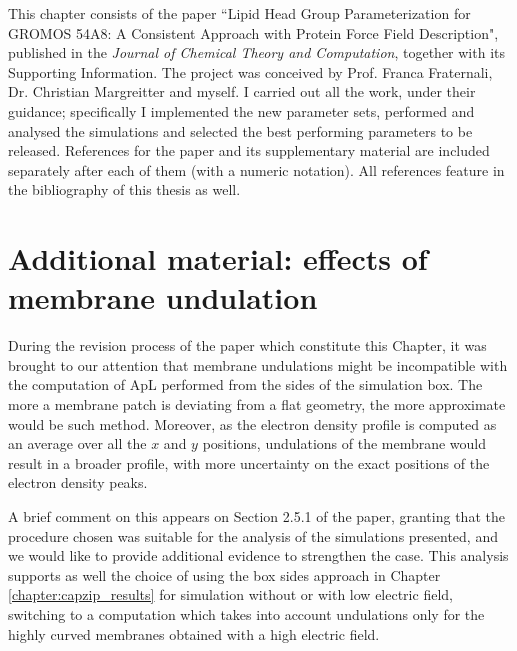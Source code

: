 This chapter consists of the paper ``Lipid Head Group Parameterization for GROMOS 54A8: A Consistent Approach with Protein Force Field Description", published in the \emph{Journal of Chemical Theory and Computation}, together with its Supporting Information. The project was conceived by Prof. Franca Fraternali, Dr. Christian Margreitter and myself. I carried out all the work, under their guidance; specifically I implemented the new parameter sets, performed and analysed the simulations and selected the best performing parameters to be released. References for the paper and its supplementary material are included separately after each of them (with a numeric notation). All references feature in the bibliography of this thesis as well.

%

%
%
%
%
%


\section{Additional material: effects of membrane undulation}

During the revision process of the paper which constitute this Chapter, it was brought to our attention that membrane undulations might be incompatible with the computation of ApL performed from the sides of the simulation box. The more a membrane patch is deviating from a flat geometry, the more approximate would be such method.
%
Moreover, as the electron density profile is computed as an average over all the $x$ and $y$ positions, undulations of the membrane would result in a broader profile, with more uncertainty on the exact positions of the electron density peaks.

A brief comment on this appears on Section 2.5.1 of the paper, granting that the procedure chosen was suitable for the analysis of the simulations presented, and we would like to provide additional evidence to strengthen the case.
%
This analysis supports as well the choice of using the box sides approach in Chapter \ref{chapter:capzip_results} for simulation without or with low electric field, switching to a computation which takes into account undulations only for the highly curved membranes obtained with a high electric field.

